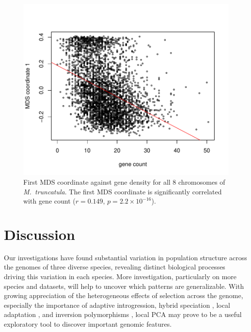 \documentclass[11pt, oneside]{article}   	%
\begin{document}
\begin{figure}
    \begin{center}
       \includegraphics{MDS_1D_against_gene_count_all_chr_win104_with_lm_update}
    \end{center}
    \caption{
        First MDS coordinate against gene density for all 8 chromosomes of \textit{M.~truncatula}.
        The first MDS coordinate is significantly correlated with gene count ($r=0.149$, $p=2.2\times 10^{-16}$). 
        \label{fig:mds_gene_count}
    }
\end{figure}

\section{Discussion}

Our investigations have found substantial variation in population structure across the genomes
of three diverse species,
revealing distinct biological processes driving this variation in each species.
More investigation, particularly on more species and datasets, will help to uncover which patterns are generalizable.
With growing appreciation of the heterogeneous effects of selection across the genome,
especially the importance of adaptive introgression, hybrid speciation \citep{pool2015natural,brandvain2014speciation,hufford2013genomic,fitzpatrick2010rapid,staubach2012genome},
local adaptation \citep{lenormand2002limits,wang2014isolation},
and inversion polymorphisms \citep{kirkpatrick2015chromosome,kirkpatrick2010chromosome},
local PCA may prove to be a useful exploratory tool to discover important genomic features.
\end{document}
